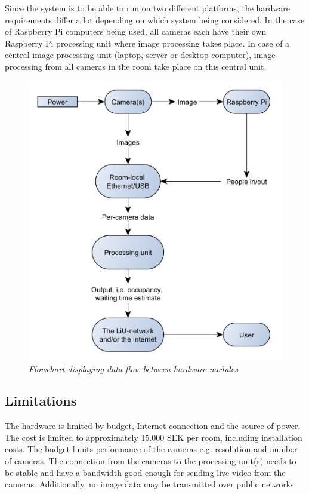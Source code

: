 
Since the system is to be able to run on two different platforms, the hardware requirements differ a lot depending on which system being considered. In the case of Raspberry Pi computers being used, all cameras each have their own Raspberry Pi processing unit where image processing takes place. In case of a central image processing unit (laptop, server or desktop computer), image processing from all cameras in the room take place on this central unit.


\begin{figure}[htb]
	\centering
	\includegraphics[width=160mm]{images/Hardware.png}
	\caption{\textit{Flowchart displaying data flow between hardware modules}}
	\label{fig:block_overview_fig}  %
\end{figure}
\newpage

\subsection{Limitations}
The hardware is limited by budget, Internet connection and the source of power. The cost is limited to approximately 15.000 SEK per room, including installation costs. The budget limits performance of the cameras e.g. resolution and number of cameras. The connection from the cameras to the processing unit(s) needs to be stable and have a bandwidth good enough for sending live video from the cameras. Additionally, no image data may be transmitted over public networks.   
\newpage
